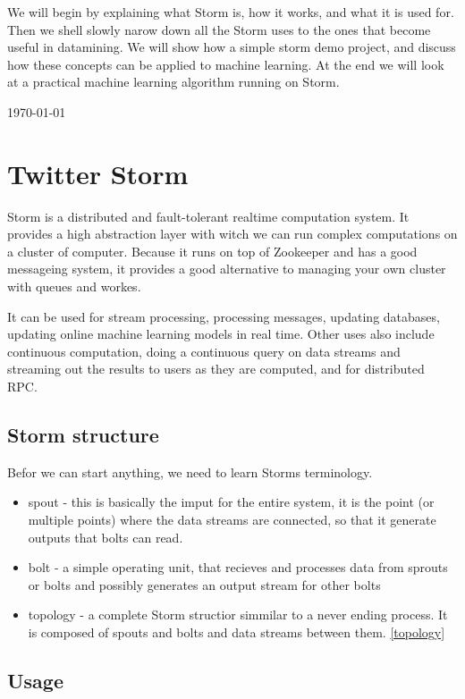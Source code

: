 \documentclass[journal]{IEEEtran/IEEEtran}
\begin{document}
We will begin by explaining what Storm is, how it works, and what it is used for. Then we shell slowly narow down all the Storm uses to the ones that become useful in datamining. We will show how a simple storm demo project, and discuss how these concepts can be applied to machine learning. At the end we will look at a practical machine learning algorithm running on Storm.

\hfill \today
\section{Twitter Storm}
Storm is a distributed and fault-tolerant realtime computation system. It provides a high abstraction layer with witch we can run complex computations on a cluster of computer. Because it runs on top of Zookeeper and has a good messageing system, it provides a good alternative to managing your own cluster with queues and workes. 

It can be used for stream processing, processing messages, updating databases, updating online machine learning models in real time. Other uses also include continuous computation, doing a continuous query on data streams and streaming out the results to users as they are computed, and for distributed RPC.


\subsection{Storm structure}
Befor we can start anything, we need to learn Storms terminology. 

\begin{itemize}
    \item spout - this is basically the imput for the entire system, it is the point (or multiple points) where the data streams are connected, so that it generate outputs that bolts can read.
    \item bolt - a simple operating unit, that recieves and processes data from sprouts or bolts and possibly generates an output stream for other bolts
    \item topology - a complete Storm structior simmilar to a never ending process. It is composed of spouts and bolts and data streams between them. \ref{topology}
\end{itemize}

\subsection{Usage}
\end{document}
